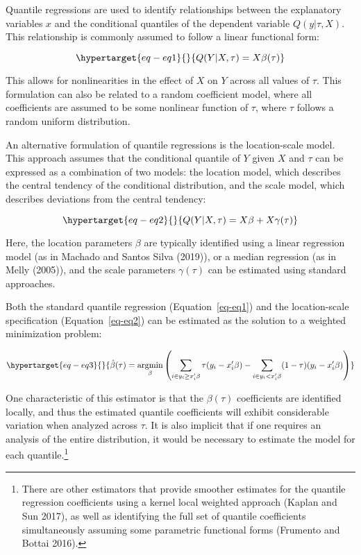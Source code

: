 \documentclass[
  letterpaper,
  DIV=11,
  numbers=noendperiod]{scrartcl}
\begin{document}
Quantile regressions are used to identify relationships between the
explanatory variables \(x\) and the conditional quantiles of the
dependent variable \(Q(y|\tau,X)\). This relationship is commonly
assumed to follow a linear functional form:

\begin{equation}\protect\hypertarget{eq-eq1}{}{Q(Y|X,\tau) =X\beta(\tau)
}\label{eq-eq1}\end{equation}

This allows for nonlinearities in the effect of \(X\) on \(Y\) across
all values of \(\tau\). This formulation can also be related to a random
coefficient model, where all coefficients are assumed to be some
nonlinear function of \(\tau\), where \(\tau\) follows a random uniform
distribution.

An alternative formulation of quantile regressions is the location-scale
model. This approach assumes that the conditional quantile of \(Y\)
given \(X\) and \(\tau\) can be expressed as a combination of two
models: the location model, which describes the central tendency of the
conditional distribution, and the scale model, which describes
deviations from the central tendency:

\begin{equation}\protect\hypertarget{eq-eq2}{}{Q(Y|X,\tau) =X\beta+X\gamma(\tau)
}\label{eq-eq2}\end{equation}

Here, the location parameters \(\beta\) are typically identified using a
linear regression model (as in Machado and Santos Silva (2019)), or a
median regression (as in Melly (2005)), and the scale parameters
\(\gamma(\tau)\) can be estimated using standard approaches.

Both the standard quantile regression (Equation~\ref{eq-eq1}) and the
location-scale specification (Equation~\ref{eq-eq2}) can be estimated as
the solution to a weighted minimization problem:

\begin{equation}\protect\hypertarget{eq-eq3}{}{\hat{\beta}(\tau) = \underset{\beta}{\operatorname{argmin}}
\left( \sum_{i\in y_i\geq x_i'\beta} \tau (y_i - x_i'\beta) - \sum_{i\in y_i<x_i'\beta} (1-\tau)(y_i - x_i'\beta) \right)
}\label{eq-eq3}\end{equation}

One characteristic of this estimator is that the \(\beta(\tau)\)
coefficients are identified locally, and thus the estimated quantile
coefficients will exhibit considerable variation when analyzed across
\(\tau\). It is also implicit that if one requires an analysis of the
entire distribution, it would be necessary to estimate the model for
each quantile.\footnote{There are other estimators that provide smoother
  estimates for the quantile regression coefficients using a kernel
  local weighted approach (Kaplan and Sun 2017), as well as identifying
  the full set of quantile coefficients simultaneously assuming some
  parametric functional forms (Frumento and Bottai 2016).}
\end{document}
